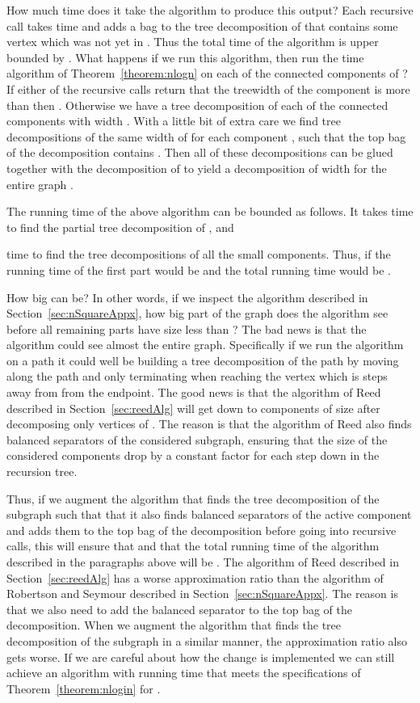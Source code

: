 \documentclass[a4paper,11pt]{article}
\theoremstyle{definition}
\theoremstyle{remark}
\begin{document}
How much time does it take the algorithm to produce this output? Each
recursive call takes  time and adds a bag to the tree
decomposition of  that contains some vertex which was not yet in
.  Thus the total time of the algorithm is upper bounded by
.  What happens if we run this algorithm,
then run the  time algorithm of
Theorem~\ref{theorem:nlogn} on each of the connected components of ? If either of the recursive calls return that the
treewidth of the component is more than  then .
Otherwise we have a tree decomposition of each of the connected
components with width .  With a little bit of extra care we find
tree decompositions of the same width of  for each
component , such that the top bag of the decomposition contains
.  Then all of these decompositions can be glued together with
the decomposition of  to yield a decomposition of width  for
the entire graph .

The running time of the above algorithm can be bounded as follows.  It
takes  time to find the partial tree
decomposition of , and
 
time to find the tree decompositions of all the small components.
Thus, if  the running time of the
first part would be  and the total running time would be
.

How big can  be? In other words, if we inspect the algorithm
described in Section~\ref{sec:nSquareAppx}, how big part of the graph
does the algorithm see before all remaining parts have size less than
? The bad news is that the algorithm could see almost the
entire graph.  Specifically if we run the algorithm on a path it could
well be building a tree decomposition of the path by moving along the
path and only terminating when reaching the vertex which is 
steps away from from the endpoint.  The good news is that the
algorithm of Reed described in Section~\ref{sec:reedAlg} will get down
to components of size  after decomposing only  vertices of .  The reason is that the algorithm of Reed also
finds balanced separators of the considered subgraph, ensuring that
the size of the considered components drop by a constant factor for
each step down in the recursion tree.

Thus, if we augment the algorithm that finds the tree decomposition of
the subgraph  such that that it also finds balanced separators of
the active component and adds them to the top bag of the decomposition
before going into recursive calls, this will ensure that  and that the total running time of the algorithm
described in the paragraphs above will be .  The
algorithm of Reed described in Section~\ref{sec:reedAlg} has a worse
approximation ratio than the algorithm of Robertson and Seymour
described in Section~\ref{sec:nSquareAppx}.  The reason is that we
also need to add the balanced separator to the top bag of the
decomposition.  When we augment the algorithm that finds the tree
decomposition of the subgraph  in a similar manner, the
approximation ratio also gets worse.  If we are careful about how the
change is implemented we can still achieve an algorithm with running
time  that meets the specifications of
Theorem~\ref{theorem:nlogin} for .
\end{document}
